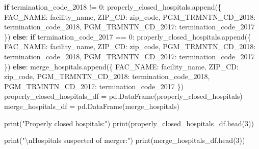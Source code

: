 \documentclass[
  letterpaper,
  DIV=11,
  numbers=noendperiod]{scrartcl}
\newenvironment{Shaded}{\begin{snugshade}}{\end{snugshade}}
\newcommand{\BuiltInTok}[1]{\textcolor[rgb]{0.00,0.23,0.31}{#1}}
\newcommand{\CharTok}[1]{\textcolor[rgb]{0.13,0.47,0.30}{#1}}
\newcommand{\ControlFlowTok}[1]{\textcolor[rgb]{0.00,0.23,0.31}{\textbf{#1}}}
\newcommand{\DecValTok}[1]{\textcolor[rgb]{0.68,0.00,0.00}{#1}}
\newcommand{\NormalTok}[1]{\textcolor[rgb]{0.00,0.23,0.31}{#1}}
\newcommand{\OperatorTok}[1]{\textcolor[rgb]{0.37,0.37,0.37}{#1}}
\newcommand{\StringTok}[1]{\textcolor[rgb]{0.13,0.47,0.30}{#1}}
\begin{document}
\begin{Shaded}
\begin{Highlighting}[]
    \ControlFlowTok{if}\NormalTok{ termination\_code\_2018 }\OperatorTok{!=} \StringTok{\textquotesingle{}0\textquotesingle{}}\NormalTok{:}
\NormalTok{        properly\_closed\_hospitals.append(\{}
            \StringTok{\textquotesingle{}FAC\_NAME\textquotesingle{}}\NormalTok{: facility\_name,}
            \StringTok{\textquotesingle{}ZIP\_CD\textquotesingle{}}\NormalTok{: zip\_code,}
            \StringTok{\textquotesingle{}PGM\_TRMNTN\_CD\_2018\textquotesingle{}}\NormalTok{: termination\_code\_2018,}
            \StringTok{\textquotesingle{}PGM\_TRMNTN\_CD\_2017\textquotesingle{}}\NormalTok{: termination\_code\_2017}
\NormalTok{        \})}
    \ControlFlowTok{else}\NormalTok{:}
        \ControlFlowTok{if}\NormalTok{ termination\_code\_2017 }\OperatorTok{==} \StringTok{\textquotesingle{}0\textquotesingle{}}\NormalTok{:}
\NormalTok{            properly\_closed\_hospitals.append(\{}
                \StringTok{\textquotesingle{}FAC\_NAME\textquotesingle{}}\NormalTok{: facility\_name,}
                \StringTok{\textquotesingle{}ZIP\_CD\textquotesingle{}}\NormalTok{: zip\_code,}
                \StringTok{\textquotesingle{}PGM\_TRMNTN\_CD\_2018\textquotesingle{}}\NormalTok{: termination\_code\_2018,}
                \StringTok{\textquotesingle{}PGM\_TRMNTN\_CD\_2017\textquotesingle{}}\NormalTok{: termination\_code\_2017}
\NormalTok{            \})}
        \ControlFlowTok{else}\NormalTok{:}
\NormalTok{            merge\_hospitals.append(\{}
                \StringTok{\textquotesingle{}FAC\_NAME\textquotesingle{}}\NormalTok{: facility\_name,}
                \StringTok{\textquotesingle{}ZIP\_CD\textquotesingle{}}\NormalTok{: zip\_code,}
                \StringTok{\textquotesingle{}PGM\_TRMNTN\_CD\_2018\textquotesingle{}}\NormalTok{: termination\_code\_2018,}
                \StringTok{\textquotesingle{}PGM\_TRMNTN\_CD\_2017\textquotesingle{}}\NormalTok{: termination\_code\_2017}
\NormalTok{            \})}
\NormalTok{properly\_closed\_hospitals\_df }\OperatorTok{=}\NormalTok{ pd.DataFrame(properly\_closed\_hospitals)}
\NormalTok{merge\_hospitals\_df }\OperatorTok{=}\NormalTok{ pd.DataFrame(merge\_hospitals)}

\BuiltInTok{print}\NormalTok{(}\StringTok{"Properly closed hospitals:"}\NormalTok{)}
\BuiltInTok{print}\NormalTok{(properly\_closed\_hospitals\_df.head(}\DecValTok{3}\NormalTok{))}

\BuiltInTok{print}\NormalTok{(}\StringTok{"}\CharTok{\textbackslash{}n}\StringTok{Hospitals suspected of merger:"}\NormalTok{)}
\BuiltInTok{print}\NormalTok{(merge\_hospitals\_df.head(}\DecValTok{3}\NormalTok{))}


\end{Highlighting}
\end{Shaded}
\end{document}
